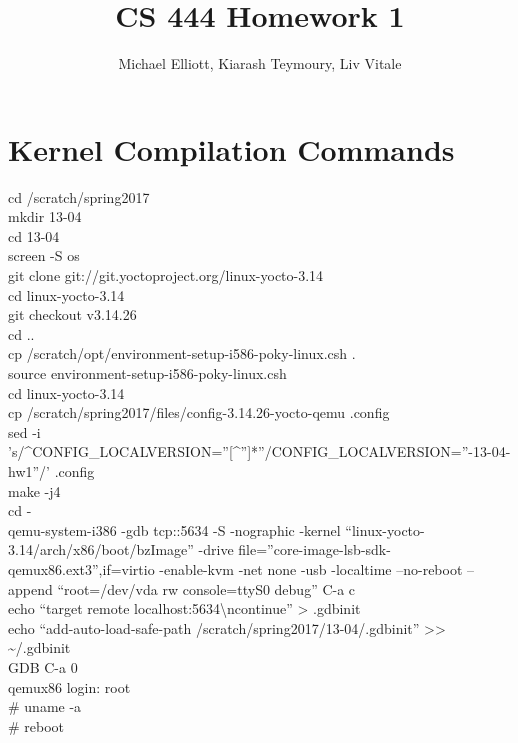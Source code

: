 \documentclass[letterpaper,10pt,titlepage,draftclsnofoot,onecolumn]{IEEEtran}
\title{CS 444 Homework 1}
\author{Michael Elliott, Kiarash Teymoury, Liv Vitale}
\begin{document}
\begin{titlingpage}
\maketitle
\end{titlingpage}

\section{Kernel Compilation Commands}
\textdollar{} cd /scratch/spring2017
\\\textdollar{} mkdir 13-04
\\\textdollar{} cd 13-04
\\\textdollar{} screen -S os
\\\textdollar{} git clone git://git.yoctoproject.org/linux-yocto-3.14
\\\textdollar{} cd linux-yocto-3.14
\\\textdollar{} git checkout v3.14.26
\\\textdollar{} cd ..
\\\textdollar{} cp /scratch/opt/environment-setup-i586-poky-linux.csh .
\\\textdollar{} source environment-setup-i586-poky-linux.csh
\\\textdollar{} cd linux-yocto-3.14
\\\textdollar{} cp /scratch/spring2017/files/config-3.14.26-yocto-qemu .config
\\\textdollar{} sed -i 's/\^{}CONFIG\_LOCALVERSION=''[\^{}'']*''\textdollar{}/CONFIG\_LOCALVERSION=''-13-04-hw1''/' .config
\\\textdollar{} make -j4
\\\textdollar{} cd -
\\\textdollar{} qemu-system-i386 -gdb tcp::5634 -S -nographic -kernel ``linux-yocto-3.14/arch/x86/boot/bzImage'' -drive file=''core-image-lsb-sdk-qemux86.ext3'',if=virtio -enable-kvm -net none -usb -localtime --no-reboot --append ``root=/dev/vda rw console=ttyS0 debug''
C-a c
\\\textdollar{} echo ``target remote localhost:5634\textbackslash{}ncontinue'' \textgreater{} .gdbinit
\\\textdollar{} echo ``add-auto-load-safe-path /scratch/spring2017/13-04/.gdbinit'' \textgreater{}\textgreater{} \textasciitilde{}/.gdbinit
\\\textdollar{} \textdollar{}GDB
C-a 0
\\qemux86 login: root
\\\# uname -a
\\\# reboot
\end{document}
